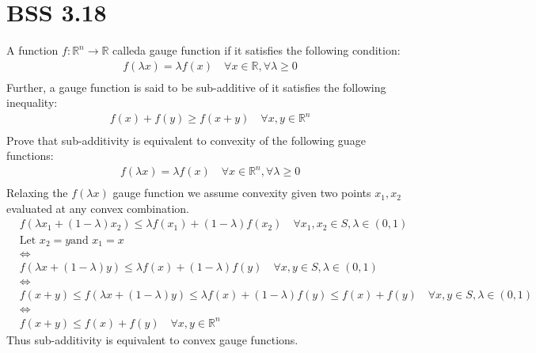 \documentclass[12pt]{article}
\newcommand{\R}{\mathbb{R}}
\begin{document}
\section{BSS 3.18}
A function $f: \R^n \longrightarrow \R$ calleda gauge function if it satisfies the following condition: 
    \begin{align*}
        &f(\lambda x) = \lambda f(x) \quad\forall x \in \R , \forall \lambda \geq 0 \\
    \end{align*}
Further, a gauge function is said to be sub-additive of it satisfies the following inequality:
    \begin{align*}
        &f(x) + f(y) \geq f(x+y) \quad \forall x,y \in \R^n \\ 
    \end{align*}
Prove that sub-additivity is equivalent to convexity of the following guage functions: 
    \begin{align*}
        &f(\lambda x) = \lambda f(x) \quad \forall x \in \R^n, \forall\lambda \geq 0\\
    \end{align*}
Relaxing the $f(\lambda x)$ gauge function we assume convexity given two points $x_1, x_2$ evaluated at any convex combination. 
    \begin{align*}
        &f(\lambda x_1 + (1-\lambda) x_2) \leq \lambda f(x_1) + (1-\lambda) f(x_2) \quad \forall x_1, x_2 \in S, \lambda \in (0,1) \\ 
        &\text{Let } x_2 = y \text{and } x_1 = x \\ 
        &\Leftrightarrow\\
        &f(\lambda x + (1-\lambda) y) \leq \lambda f(x) + (1-\lambda) f(y) \quad \forall x,y \in S, \lambda \in (0,1)\\
        &\Leftrightarrow\\
        &f(x+y) \leq f(\lambda x + (1-\lambda) y) \leq \lambda f(x) + (1-\lambda) f(y) \leq f(x) + f(y) \quad \forall x,y \in S, \lambda \in (0,1)\\
        &\Leftrightarrow\\
        &f(x+y) \leq f(x) + f(y) \quad \forall x,y \in \R^n
    \end{align*}
Thus sub-additivity is equivalent to convex gauge functions. 
\end{document}
